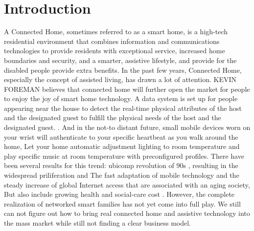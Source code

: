 \documentclass[report]{IEEEtran}
\begin{document}
\section{Introduction}
A Connected Home, sometimes referred to as a smart home, is a high-tech residential environment that combines information and communications technologies to provide residents with exceptional service, increased home boundaries and security, and a smarter, assistive lifestyle, and provide for the disabled people provide extra benefits. In the past few years, Connected Home, especially the concept of assisted living, has drawn a lot of attention. KEVIN FOREMAN believes that connected home will further open the market for people to enjoy the joy of smart home technology. A data system is set up for people appearing near the house to detect the real-time physical attributes of the host and the designated guest to fulfill the physical needs of the host and the designated guest. \cite{1}. And in the not-to distant future, small mobile devices worn on your wrist will authenticate to your specific heartbeat as you walk around the home, Let your home automatic adjustment lighting to room temperature and play specific music at room temperature with preconfigured profiles. There have been several results for this trend: ubicomp revolution of 90s \cite{2}, resulting in the widespread priliferation and The fast adaptation of mobile technology and the steady increase of global Internet access that are associated with an aging society, But also include growing health and social-care cost \cite{2}. However, the complete realization of networked smart families has not yet come into full play. We still can not figure out how to bring real connected home and assistive technology into the mass market while still not finding a clear business model.
\end{document}

